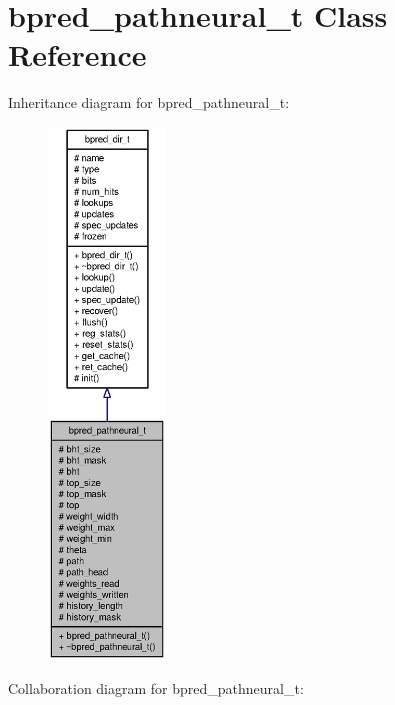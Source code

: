 \section{bpred\_\-pathneural\_\-t Class Reference}
\label{classbpred__pathneural__t}
Inheritance diagram for bpred\_\-pathneural\_\-t:\nopagebreak
\begin{figure}[H]
\begin{center}
\leavevmode
\includegraphics[height=400pt]{classbpred__pathneural__t__inherit__graph}
\end{center}
\end{figure}
Collaboration diagram for bpred\_\-pathneural\_\-t:\nopagebreak
